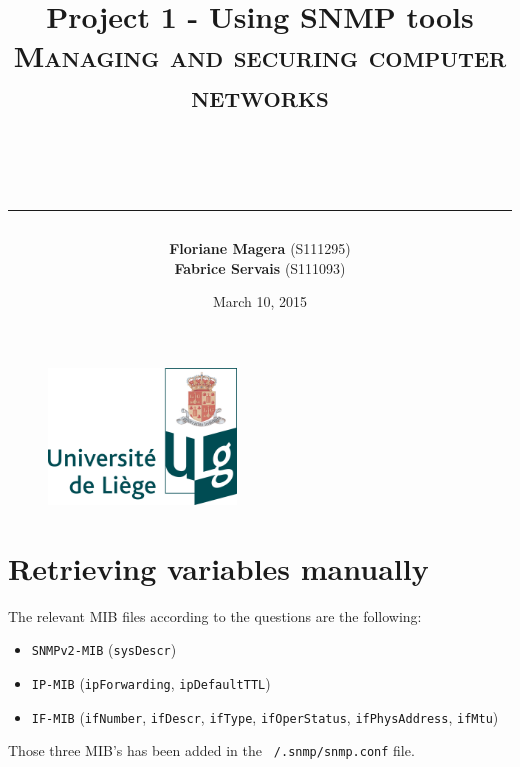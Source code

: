 \documentclass[a4paper,titlepage]{article}
\begin{document}
\begin{titlepage}

\begin{figure}
\centering
\includegraphics[width=5cm]{logo-ulg.png}
\end{figure}



\title{
\vspace{0.2cm}
\LARGE{\textbf{Project 1 - Using SNMP tools}} \\ \textsc{Managing and securing computer networks}
\author{\textbf{Floriane Magera} \small{(S111295})\\\textbf{Fabrice Servais} \small{(S111093})}\\
\date{March 10, 2015}
\rule{15cm}{1.5pt}
}

\end{titlepage}

\pagestyle{fancy}

\maketitle

\section{Retrieving variables manually}
The relevant MIB files according to the questions are the following:
\begin{itemize}
	\item \texttt{SNMPv2-MIB} (\texttt{sysDescr})
	\item \texttt{IP-MIB} (\texttt{ipForwarding}, \texttt{ipDefaultTTL})
	\item \texttt{IF-MIB} (\texttt{ifNumber}, \texttt{ifDescr}, \texttt{ifType}, \texttt{ifOperStatus}, \texttt{ifPhysAddress}, \texttt{ifMtu})
\end{itemize}

Those three MIB's has been added in the \texttt{~/.snmp/snmp.conf} file.
\end{document}
